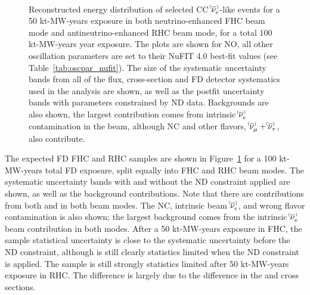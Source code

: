\begin{figure}[htbp]
 \\
 \caption{Reconstructed energy distribution of selected CC $\nue^{\bracketbar}$-like events for a 50 kt-MW-years exposure in both neutrino-enhanced FHC beam mode and antineutrino-enhanced RHC beam mode, for a total 100 kt-MW-years year exposure. The plots are shown for NO, all other oscillation parameters are set to their NuFIT 4.0 best-fit values (see Table~\ref{tab:oscpar_nufit}). The size of the systematic uncertainty bands from all of the flux, cross-section and FD detector systematics used in the analysis are shown, as well as the postfit uncertainty bands with parameters constrained by ND data. Backgrounds are also shown, the largest contribution comes from intrinsic $\nue^{\bracketbar}$ contamination in the beam, although NC and other flavors, $\numu^{\bracketbar} + \nutau^{\bracketbar}$, also contribute.}
 \label{fig:appspectra}
\end{figure}
The expected FD FHC \nue and RHC \anue samples are shown in Figure~\ref{fig:appspectra} for a 100 kt-MW-years total FD exposure, split equally into FHC and RHC beam modes. The systematic uncertainty bands with and without the ND constraint applied are shown, as well as the background contributions. Note that there are contributions from both \nue and \anue in both beam modes. The NC, intrinsic beam $\nue^{\bracketbar}$, and wrong flavor contamination is also shown; the largest background comes from the intrinsic $\nue^{\bracketbar}$ beam contribution in both modes. After a 50 kt-MW-years exposure in FHC, the \nue sample statistical uncertainty is close to the systematic uncertainty before the ND constraint, although is still clearly statistics limited when the ND constraint is applied. The \anue sample is still strongly statistics limited after 50 kt-MW-years exposure in RHC. The difference is largely due to the difference in the \nue and \anue cross sections. %

